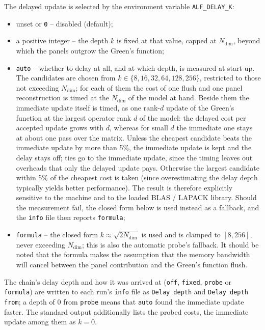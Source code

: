 The delayed update is selected by the environment variable
\texttt{ALF\_DELAY\_K}:
\begin{itemize}
  \item unset or \texttt{0} -- disabled (default);
  \item a positive integer -- the depth $k$ is fixed at that value, capped at
    $N_{\mathrm{dim}}$, beyond which the panels outgrow the Green's function;
  \item \texttt{auto} -- whether to delay at all, and at which depth, is
    measured at start-up.  The candidates are chosen from
    $k \in \{8,\allowbreak 16,\allowbreak 32,\allowbreak 64,\allowbreak 128,\allowbreak 256\}$, restricted to those not exceeding
    $N_{\mathrm{dim}}$; for each of them the cost of one flush and one panel
    reconstruction is timed at the $N_{\mathrm{dim}}$ of the model at hand.
    Beside them the immediate update itself is timed, as one rank-$d$ update of
    the Green's function at the largest operator rank $d$ of the model: the
    delayed cost per accepted update grows with $d$, whereas for small $d$ the
    immediate one stays at about one pass over the matrix.  Unless the cheapest
    candidate beats the immediate update by more than 5\%, the immediate update
    is kept and the delay stays off; ties go to the immediate update, since the
    timing leaves out overheads that only the delayed update pays.  Otherwise
    the largest candidate within 5\% of the cheapest cost is taken (since
    overestimating the delay depth typically yields better performance).  The
    result is therefore explicitly sensitive to the machine and to the loaded
    BLAS / LAPACK library.  Should the measurement fail, the closed form below is
    used instead as a fallback, and the \texttt{info} file then reports
    \texttt{formula};
  \item \texttt{formula} -- the closed form 
    $k \approx \sqrt{2 N_{\mathrm{dim}}}$ is used and is clamped to $[8, 256]$,
    never exceeding $N_{\mathrm{dim}}$; this is also the automatic probe's
    fallback. It should be noted that the formula makes the assumption that the
    memory bandwidth will cancel between the panel contribution and the Green's
    function flush.
\end{itemize}

The chain's delay depth and how it was arrived at
(\texttt{off}, \texttt{fixed}, \texttt{probe} or \texttt{formula}) are written
to each run's \texttt{info} file as \texttt{Delay depth} and
\texttt{Delay depth from}; a depth of 0 from \texttt{probe} means that
\texttt{auto} found the immediate update faster.  The standard output
additionally lists the probed costs, the immediate update among them as
$k = 0$.
%
